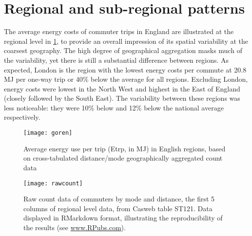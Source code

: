 \section{Regional and sub-regional patterns} \label{sregional}
The average energy costs of commuter trips in England
are illustrated at the regional level in \cref{fgoren}, to provide an
overall impression of its spatial variability at the coarsest geography.
The high degree of geographical aggregation masks much of the variability,
yet there is still a substantial difference between regions. As expected,
London is the region with the lowest energy costs per commute at
20.8 MJ per one-way trip or 40\% below the average for all regions.
Excluding London, energy costs were lowest in the North West
and highest in the East of England (closely followed by the South East).
The variability between these regions was less noticeable:
they were 10\% below and 12\% below the national average respectively.


\begin{figure}[htbp]
\begin{center}
    \texttt{[image: goren]}  \end{center}
  \caption[Average energy use per trip (Etrp, in MJ) in English regions]
  {Average energy use per trip (Etrp, in MJ) in English regions, based
  on cross-tabulated distance/mode geographically aggregated count data}
 \label{fgoren}
\end{figure}

\begin{figure}[htbp]
\begin{center}
    \texttt{[image: rawcount]}  \end{center}
  \caption[Raw count data of commuters by mode and distance.]
  {Raw count data of commuters by mode and distance, the first 5 columns of
  regional level data, from Casweb table ST121. Data displayed in RMarkdown
  format, illustrating the reproducibility of the results (see
  \href{http://rpubs.com/robinlovelace}{www.RPubs.com}).}
 \label{frcount}
\end{figure}

